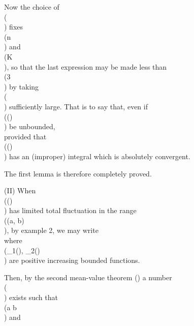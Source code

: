 Now the choice of \\(\eps\\) fixes \\(n\\) and \\(K\\), so that the last expression may be
made less than \\(3\eps\\) by taking \\(\lambda\\) sufficiently large. That is to say
that, even if \\(\psi(\theta)\\) be unbounded,
\\[ 
\lim_{\lambda \rightarrow \infty}
\int_{a}^{b}\! \psi(\theta) \sin(\lambda \theta) \, d \theta
=
0,
\\] 
provided that \\(\psi(\theta)\\) has an (improper) integral which is absolutely
convergent.

The first lemma is therefore completely proved.

(II) When \\(\psi(\theta)\\) has limited total fluctuation in the range \\((a, b)\\),
by %
 example 2, we may write
\\[ 
\psi(\theta) = \chi_{1}(\theta) - \chi_{2}(\theta),
\\] 
where \\(\chi_{1}(\theta), \chi_{2}(\theta)\\) are positive increasing bounded functions.

Then, by the second mean-value theorem () a number
\\(\xi\\) exists such that \\(a \leq \xi \leq b\\) and
\\[ \begin{align*}
  \left| \, 
    \int_{a}^{b}\! \chi_{1}(\theta) \sin(\lambda \theta) \, d \theta
   \, \right| 
  &=
  \left| \, 
    \chi_{1}(b) \int_{\xi}^{b}\! \sin(\lambda \theta) \, d \theta
   \, \right| 
  \\
  & \leq
  2 \chi_{1}(b) / \lambda.
\end{align*} \\]

